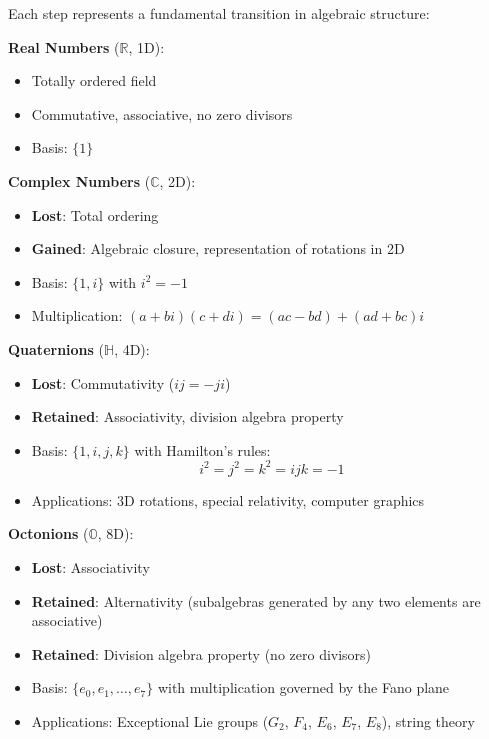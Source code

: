 Each step represents a fundamental transition in algebraic structure:

\textbf{Real Numbers} ($\mathbb{R}$, 1D):
\begin{itemize}
    \item Totally ordered field
    \item Commutative, associative, no zero divisors
    \item Basis: $\{1\}$
\end{itemize}

\textbf{Complex Numbers} ($\mathbb{C}$, 2D):
\begin{itemize}
    \item \textbf{Lost}: Total ordering
    \item \textbf{Gained}: Algebraic closure, representation of rotations in 2D
    \item Basis: $\{1, i\}$ with $i^2 = -1$
    \item Multiplication: $(a + bi)(c + di) = (ac - bd) + (ad + bc)i$
\end{itemize}

\textbf{Quaternions} ($\mathbb{H}$, 4D):
\begin{itemize}
    \item \textbf{Lost}: Commutativity ($ij = -ji$)
    \item \textbf{Retained}: Associativity, division algebra property
    \item Basis: $\{1, i, j, k\}$ with Hamilton's rules:
    \begin{equation}
        i^2 = j^2 = k^2 = ijk = -1
    \end{equation}
    \item Applications: 3D rotations, special relativity, computer graphics
\end{itemize}

\textbf{Octonions} ($\mathbb{O}$, 8D):
\begin{itemize}
    \item \textbf{Lost}: Associativity
    \item \textbf{Retained}: Alternativity (subalgebras generated by any two elements are associative)
    \item \textbf{Retained}: Division algebra property (no zero divisors)
    \item Basis: $\{e_0, e_1, \ldots, e_7\}$ with multiplication governed by the Fano plane
    \item Applications: Exceptional Lie groups ($G_2$, $F_4$, $E_6$, $E_7$, $E_8$), string theory \cite{baez2001octonions}
\end{itemize}

